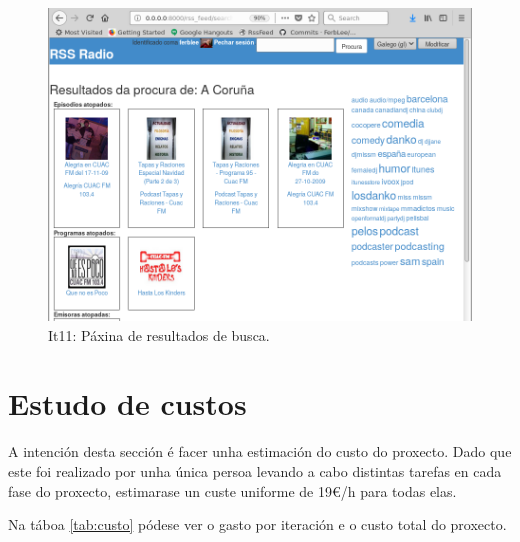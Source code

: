 \begin{figure}[H]
	\centering
	\includegraphics[scale=0.45,keepaspectratio=true]{./images/procura_final.png}
	\caption{It11: Páxina de resultados de busca.}
	\label{fig:procura_final}
\end{figure}


\section{Estudo de custos}

A intención desta sección é facer unha estimación do custo do proxecto. Dado que este foi realizado por unha única persoa levando a cabo distintas tarefas en cada fase do proxecto, estimarase un custe uniforme de 19€/h para todas elas. 

Na táboa \ref{tab:custo} pódese ver o gasto por iteración e o custo total do proxecto.

